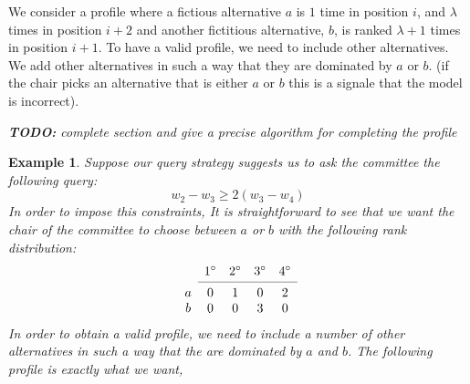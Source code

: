 \documentclass[12pt]{article}
\newtheorem{example}{Example}
\begin{document}
We consider a profile where a fictious alternative $a$ is $1$ time in position $i$, and $\lambda$ times 
in position $i+2$ and another fictitious alternative, $b$, is ranked $\lambda+1$ times in position $i+1$.
To have a valid profile, we need to include other alternatives.
We add other alternatives in such a way that they are dominated by $a$ or $b$. 
(if the chair picks an alternative that is either $a$ or $b$ this is a signale that the model is incorrect).

\vspace{1cm}
{\em {\bf TODO:} complete section and give a precise algorithm for completing the profile}
\vspace{1cm}

\begin{example}
Suppose our query strategy suggests us to ask the committee the following query:
\[ w_{2} - w_{3} \geq 2(w_{3} - w_{4}) \]
In order to impose this constraints,
It is straightforward to see that we want the  chair of the committee to choose between $a$ or $b$ with the following rank distribution:
\[
\begin{array}{ccccc}
& 1^\circ
& 2^\circ
& 3^\circ
& 4^\circ \\
\cmidrule{2-5}
a & 0& 1& 0& 2 \\
b& 0& 0& 3& 0 \\
\end{array}
\]
In order to obtain a valid profile, we need to include a number of other alternatives in such a way that the are dominated by $a$ and $b$.
The following profile is exactly what we want,


\end{example}
\end{document}
